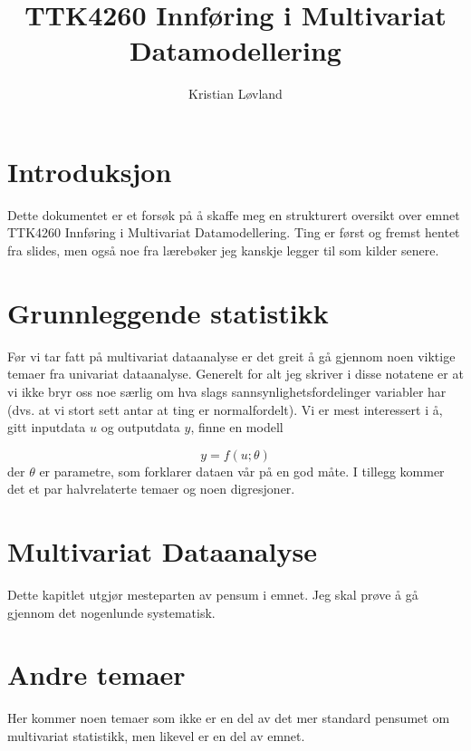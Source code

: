 \documentclass[12pt]{article}
\title{TTK4260 Innføring i Multivariat Datamodellering}
\date{}
\author{Kristian Løvland}
\begin{document}
\maketitle
\tableofcontents

\newpage
\section{Introduksjon}
Dette dokumentet er et forsøk på å skaffe meg en strukturert oversikt over emnet TTK4260 Innføring i Multivariat Datamodellering. Ting er først og fremst hentet fra slides, men også noe fra lærebøker jeg kanskje legger til som kilder senere.

\newpage
\section{Grunnleggende statistikk}
Før vi tar fatt på multivariat dataanalyse er det greit å gå gjennom noen viktige temaer fra univariat dataanalyse. Generelt for alt jeg skriver i disse notatene er at vi ikke bryr oss noe særlig om hva slags sannsynlighetsfordelinger variabler har (dvs. at vi stort sett antar at ting er normalfordelt). Vi er mest interessert i å, gitt inputdata $u$ og outputdata $y$, finne en modell

\begin{equation}
	y = f(u; \theta)
\end{equation}
der $\theta$ er parametre, som forklarer dataen vår på en god måte. I tillegg kommer det et par halvrelaterte temaer og noen digresjoner.

% 






\newpage
\section{Multivariat Dataanalyse}
Dette kapitlet utgjør mesteparten av pensum i emnet. Jeg skal prøve å gå gjennom det nogenlunde systematisk.









\newpage
\section{Andre temaer}
Her kommer noen temaer som ikke er en del av det mer standard pensumet om multivariat statistikk, men likevel er en del av emnet.


\end{document}
